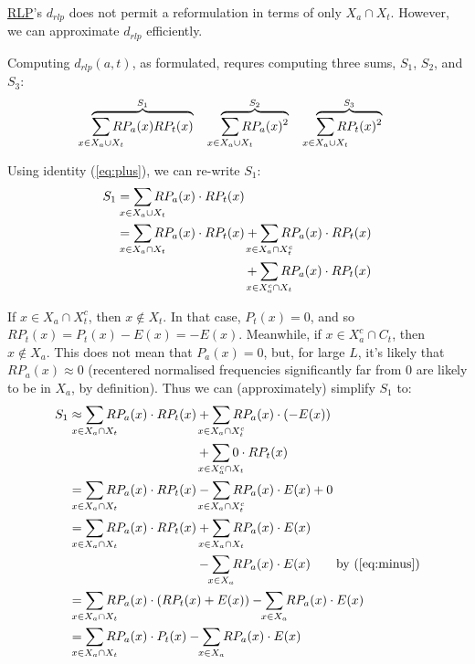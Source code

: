 \documentclass[twocolumn,10pt]{article}
\begin{document}
\hyperlink{par:rlp}{RLP}'s $d_{rlp}$ does not permit
a reformulation in terms of only $X_a \cap X_t$. However, we can
approximate $d_{rlp}$ efficiently.

Computing $d_{rlp}(a, t)$, as formulated, requres computing three
sums, $S_1$, $S_2$, and $S_3$:
$$
\overbrace{
    \smashoperator{\sum_{x \in X_a \cup X_t}} RP_a(x) RP_t(x)
}^{S_1}
\qquad
\overbrace{
    \smashoperator{\sum_{x \in X_a \cup X_t}} RP_a(x)^2
}^{S_2}
\qquad
\overbrace{
    \smashoperator{\sum_{x \in X_a \cup X_t}} RP_t(x)^2
}^{S_3}
$$

Using identity (\ref{eq:plus}), we can re-write $S_1$: 
\begin{align*}
S_1
&= 
\smashoperator{\sum_{x \in X_a \cup X_t}}
    RP_a(x) \cdot RP_t(x)
\\
&=
\smashoperator{\sum_{x \in X_a \cap X_t}}
    RP_a(x) \cdot RP_t(x)
+
\smashoperator{\sum_{x \in X_a \cap X_t^c}}
    RP_a(x) \cdot RP_t(x)
\\
&\hspace{10em}+
\smashoperator{\sum_{x \in X_a^c \cap X_t}}
    RP_a(x) \cdot RP_t(x)
\end{align*}

If $x \in X_a \cap X_t^c$, then $x \notin X_t$. In that case,
$P_t(x)=0$, and so $RP_t(x) = P_t(x) - E(x) = -E(x)$.
Meanwhile, if $x \in X_a^c \cap C_t$, then $x \notin X_a$.
This does not mean that $P_a(x) = 0$, but, for large $L$,
it's likely that $RP_a(x) \approx 0$ (recentered normalised
frequencies significantly far from 0 are likely to be in $X_a$,
by definition).
Thus we can (approximately) simplify $S_1$ to:
\begin{align*}
S_1
&\approx
\smashoperator{\sum_{x \in X_a \cap X_t}}
    RP_a(x) \cdot RP_t(x)
+
\smashoperator{\sum_{x \in X_a \cap X_t^c}}
    RP_a(x) \cdot (-E(x))
\\
&\hspace{10em}+
\smashoperator{\sum_{x \in X_a^c \cap X_t}}
    0 \cdot RP_t(x)
\\
&=
\smashoperator{\sum_{x \in X_a \cap X_t}}
    RP_a(x) \cdot RP_t(x)
-
\smashoperator{\sum_{x \in X_a \cap X_t^c}}
    RP_a(x) \cdot E(x)
+ 0
\\
&=
\smashoperator{\sum_{x \in X_a \cap X_t}}
    RP_a(x) \cdot RP_t(x)
+
\smashoperator{\sum_{x \in X_a \cap X_t}}
    RP_a(x) \cdot E(x)
\\
&\hspace{10em}-
\smashoperator{\sum_{x \in X_a}}
    RP_a(x) \cdot E(x)
\tag*{by (\ref{eq:minus})}
\\
&=
\smashoperator{\sum_{x \in X_a \cap X_t}}
    RP_a(x) \cdot (RP_t(x) + E(x))
-
\smashoperator{\sum_{x \in X_a}}
    RP_a(x) \cdot E(x)
\\
&=
\smashoperator{\sum_{x \in X_a \cap X_t}}
    RP_a(x) \cdot P_t(x)
-
\smashoperator{\sum_{x \in X_a}}
    RP_a(x) \cdot E(x)
\end{align*}
\end{document}
